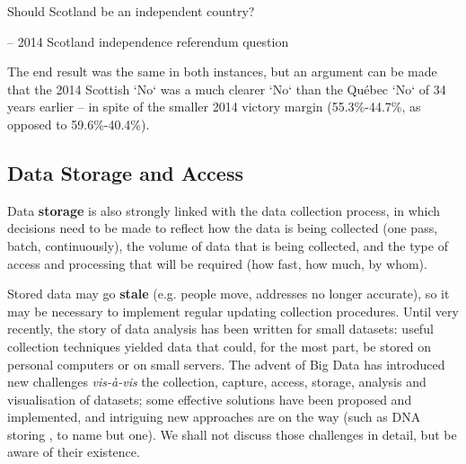 \begin{tcolorbox}[title=Ont-ils tirés des lesons de 1980?]
Should Scotland be an independent country? \\[-0.6cm]
\begin{flushright}
-- 2014 Scotland independence referendum question
\end{flushright}
\end{tcolorbox}
\noindent The end result was the same in both instances, but an argument can be made that the 2014 Scottish `No` was a much clearer `No` than the Qu\'ebec `No` of 34 years earlier -- in spite of the smaller 2014 victory margin (55.3\%-44.7\%, as opposed to 59.6\%-40.4\%). 
\subsection{Data Storage and Access}
Data \textbf{storage} is also strongly linked with the data collection process, in which decisions need to be made to reflect how the data is being collected (one pass, batch, continuously), the volume of data that is being collected, and the type of access and processing that will be required (how fast, how much, by whom).\par Stored data may go \textbf{stale} (e.g. people move, addresses no longer accurate), so it may be necessary to implement regular updating collection procedures. 
\newl 
Until very recently, the story of data analysis has been written for small datasets: useful collection techniques yielded data that could, for the most part, be stored on personal computers or on small servers. The advent of Big Data has introduced new challenges \textit{vis-\`a-vis} the collection, capture, access, storage, analysis and visualisation of datasets; some effective solutions have been proposed and implemented, and intriguing new approaches are on the way (such as DNA storing \cite{DC_DNA}, to name but one). We shall not discuss those challenges in detail, but be aware of their existence.  

